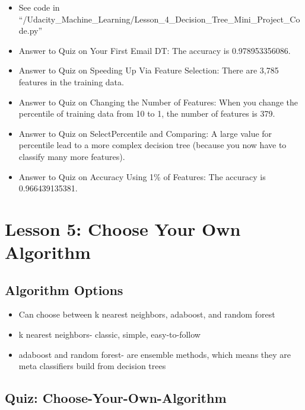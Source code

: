 \documentclass[12pt]{report}
\begin{document}
\begin{itemize}

\item See code in ``/Udacity\_Machine\_Learning/Lesson\_4\_Decision\_Tree\_Mini\_Project\_Code.py''

\item Answer to Quiz on Your First Email DT: The accuracy is 0.978953356086. 

\item Answer to Quiz on Speeding Up Via Feature Selection: There are 3,785 features in the training data. 

\item Answer to Quiz on Changing the Number of Features: When you change the percentile of training data from 10 to 1, the number of features is 379. 

\item Answer to Quiz on SelectPercentile and Comparing:  A large value for percentile lead to a more complex decision tree (because you now have to classify many more features). 

\item Answer to Quiz on Accuracy Using 1\% of Features: The accuracy is 0.966439135381. 

\end{itemize}

\section{Lesson 5: Choose Your Own Algorithm}

\subsection{Algorithm Options}

\begin{itemize}

\item Can choose between k nearest neighbors, adaboost, and random forest

\item k nearest neighbors- classic, simple, easy-to-follow

\item adaboost and random forest- are ensemble methods, which means they are meta classifiers build from decision trees

\end{itemize}

\subsection{Quiz: Choose-Your-Own-Algorithm}
\end{document}
